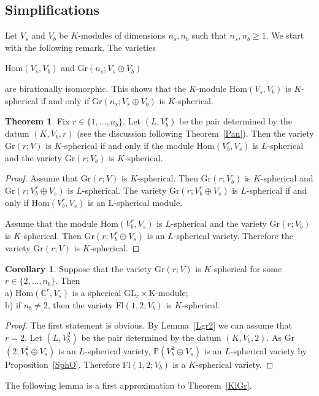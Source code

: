 \documentclass[12pt]{amsart}
\theoremstyle{definition}\newtheorem{theorem}{Theorem}[section]
\newtheorem{corollary}[proposition]{Corollary}
\theoremstyle{definition}\newtheorem{definition}[proposition]{Definition}
\theoremstyle{remark}\newtheorem{example}[proposition]{Example}
\begin{document}
\subsection{Simplifications} Let $V_s$ and $V_b$ be $K$-modules of dimensions $n_s, n_b$ such that $n_s, n_b\ge 1$. We start with the following remark. The varieties \begin{center}Hom$(V_s, V_b)$ and Gr$(n_s; V_s\oplus V_b)$\end{center} are birationally isomorphic. This shows that the $K$-module Hom$(V_s, V_b)$ is $K$-spherical if and only if Gr$(n_s; V_s\oplus V_b)$ is $K$-spherical.
\begin{theorem}\label{PTr} Fix $r\in\{1,..., n_b\}$. Let $(L, V_b^r)$ be the pair determined by the datum $(K, V_b, r)$ (see the discussion following Theorem~\ref{Pan}). Then the variety Gr$(r; V)$ is $K$-spherical if and only if the module Hom$(V_b^r, V_s)$ is $L$-spherical and the variety Gr$(r; V_b)$ is $K$-spherical.\end{theorem}
\begin{proof}Assume that Gr$(r; V)$ is $K$-spherical. Then Gr$(r; V_b)$ is $K$-spherical and Gr$(r; V_b^r\oplus V_s)$ is $L$-spherical. The variety Gr$(r; V_b^r\oplus V_s)$ is $L$-spherical if and only if Hom$(V_b^r, V_s)$ is an L-spherical module.

Assume that the module Hom$(V_b^r, V_s)$ is $L$-spherical and the variety Gr$(r; V_b)$ is $K$-spherical. Then Gr$(r; V_b^r\oplus V_s)$ is an $L$-spherical variety. Therefore the variety Gr$(r; V)$ is $K$-spherical.\end{proof}
\begin{corollary}\label{GG} Suppose that the variety Gr$(r; V)$ is $K$-spherical for some $r\in\{2,..., n_b\}$. Then\\a) Hom$(\mathbb C^r, V_s)$ is a spherical GL$_r\times$K-module;\\b) if $n_b\ne 2$, then the variety Fl$(1,2; V_b)$ is $K$-spherical.\end{corollary}
\begin{proof}The first statement is obvious. By Lemma~\ref{Lgr2} we can assume that $r=2$. Let $(L, V_b^2)$ be the pair determined by the datum $(K, V_b, 2)$. As Gr$(2; V_b^2\oplus V_s)$ is an $L$-spherical variety, $\mathbb P(V_b^2\oplus V_s)$ is an $L$-spherical variety by Proposition~\ref{SphO}. Therefore Fl$(1,2; V_b)$ is a $K$-spherical variety.\end{proof}
The following lemma is a first approximation to Theorem~\ref{KlGr}.
\end{document}
